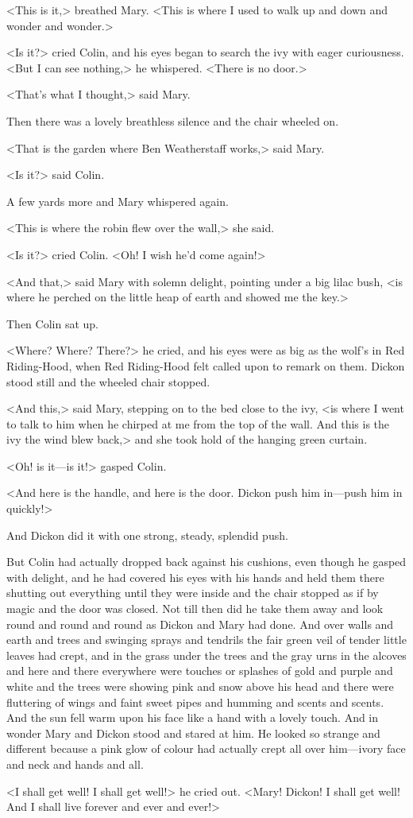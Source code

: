 <This is it,> breathed Mary. <This is where I used to walk up and down and wonder and wonder.>

<Is it?> cried Colin, and his eyes began to search the ivy with eager curiousness. <But I can see nothing,> he whispered. <There is no door.>

<That's what I thought,> said Mary.

Then there was a lovely breathless silence and the chair wheeled on.

<That is the garden where Ben Weatherstaff works,> said Mary.

<Is it?> said Colin.

A few yards more and Mary whispered again.

<This is where the robin flew over the wall,> she said.

<Is it?> cried Colin. <Oh! I wish he'd come again!>

<And that,> said Mary with solemn delight, pointing under a big lilac bush, <is where he perched on the little heap of earth and showed me the key.>

Then Colin sat up.

<Where? Where? There?> he cried, and his eyes were as big as the wolf's in Red Riding-Hood, when Red Riding-Hood felt called upon to remark on them. Dickon stood still and the wheeled chair stopped.

<And this,> said Mary, stepping on to the bed close to the ivy, <is where I went to talk to him when he chirped at me from the top of the wall. And this is the ivy the wind blew back,> and she took hold of the hanging green curtain.

<Oh! is it—is it!> gasped Colin.

<And here is the handle, and here is the door. Dickon push him in—push him in quickly!>

And Dickon did it with one strong, steady, splendid push.

But Colin had actually dropped back against his cushions, even though he gasped with delight, and he had covered his eyes with his hands and held them there shutting out everything until they were inside and the chair stopped as if by magic and the door was closed. Not till then did he take them away and look round and round and round as Dickon and Mary had done. And over walls and earth and trees and swinging sprays and tendrils the fair green veil of tender little leaves had crept, and in the grass under the trees and the gray urns in the alcoves and here and there everywhere were touches or splashes of gold and purple and white and the trees were showing pink and snow above his head and there were fluttering of wings and faint sweet pipes and humming and scents and scents. And the sun fell warm upon his face like a hand with a lovely touch. And in wonder Mary and Dickon stood and stared at him. He looked so strange and different because a pink glow of colour had actually crept all over him—ivory face and neck and hands and all.

<I shall get well! I shall get well!> he cried out. <Mary! Dickon! I shall get well! And I shall live forever and ever and ever!>
